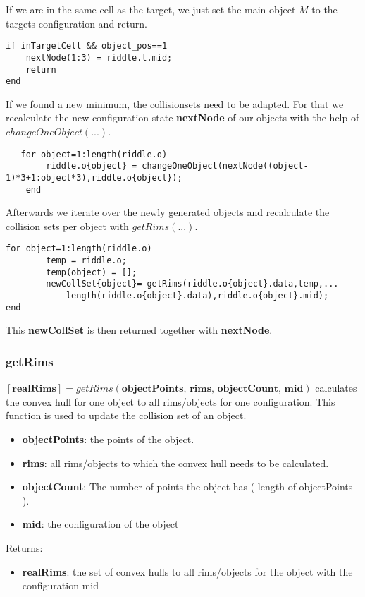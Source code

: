 If we are in the same cell as the target, we just set the main object $M$ to the targets configuration and return.
\begin{lstlisting}
if inTargetCell && object_pos==1
    nextNode(1:3) = riddle.t.mid;
    return
end
\end{lstlisting}
If we found a new minimum, the collisionsets need to be adapted. For that we recalculate the new configuration state \textbf{nextNode} of our objects with the help of $changeOneObject(...)$.
\begin{lstlisting}
   for object=1:length(riddle.o)
        riddle.o{object} = changeOneObject(nextNode((object-1)*3+1:object*3),riddle.o{object});    
    end
\end{lstlisting}
Afterwards we iterate over the newly generated objects and recalculate the collision sets per object with $getRims(...)$.
\begin{lstlisting}
for object=1:length(riddle.o)
        temp = riddle.o;
        temp(object) = [];
        newCollSet{object}= getRims(riddle.o{object}.data,temp,...
            length(riddle.o{object}.data),riddle.o{object}.mid);
end
\end{lstlisting}
This \textbf{newCollSet} is then returned together with \textbf{nextNode}.


\subsubsection{getRims}
$[\textbf{realRims} ]=getRims(\textbf{objectPoints, rims, objectCount, mid})$ calculates the convex hull for one object to all rims/objects for one configuration. This function is used to update the collision set of an object. 
\begin{itemize}
\item \textbf{objectPoints}: the points of the object.
\item \textbf{rims}: all rims/objects to which the convex hull needs to be calculated.
\item \textbf{objectCount}: The number of points the object has ( length of objectPoints ).
\item \textbf{mid}: the configuration of the object
\end{itemize}
Returns:
\begin{itemize}
\item \textbf{realRims}: the set of convex hulls to all rims/objects for the object with the configuration mid
\end{itemize}

